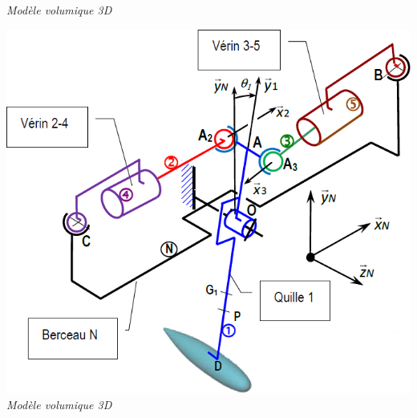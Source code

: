 \documentclass[10pt,fleqn]{article} %
\begin{document}
\begin{multicols}{2}
\begin{center}
\textit{Modèle volumique 3D}
\end{center}

\begin{center}
\includegraphics[width=\linewidth]{images/fig_04}
\textit{Modèle volumique 3D}
\end{center}



\ifprof
\else
\end{multicols}
\fi

\ifprof
\else
\end{document}
